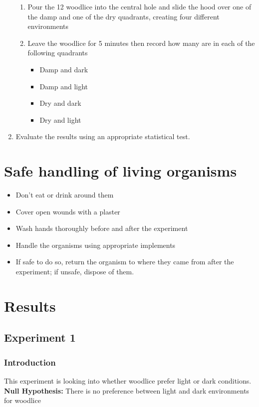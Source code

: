 \documentclass{thomasClass}
\begin{document}
\begin{enumerate}
\begin{enumerate}
        \item Pour the 12 woodlice into the central hole and slide the hood over one of the damp and one of the dry quadrants, creating four different environments
        \item Leave the woodlice for 5 minutes then record how many are in each of the following quadrants
        \begin{itemize}
            \item Damp and dark
            \item Damp and light
            \item Dry and dark
            \item Dry and light
        \end{itemize}
    \end{enumerate}
    \item Evaluate the results using an appropriate statistical test.
\end{enumerate}

\section{Safe handling of living organisms}
\begin{itemize}
    \item Don't eat or drink around them
    \item Cover open wounds with a plaster
    \item Wash hands thoroughly before and after the experiment
    \item Handle the organisms using appropriate implements
    \item If safe to do so, return the organism to where they came from after the experiment; if unsafe, dispose of them.
\end{itemize}
\section{Results}
\subsection{Experiment 1}
\subsubsection{Introduction}
This experiment is looking into whether woodlice prefer light or dark conditions. \\
\textbf{Null Hypothesis: }There is no preference between light and dark environments for woodlice
\end{document}
